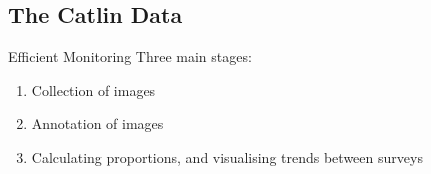 \documentclass{beamer}
\begin{document}
        \subsection{The Catlin Data}
            \begin{frame}{Efficient Monitoring}
                Three main stages:
                  \begin{enumerate}
                    \item Collection of images
                    \item Annotation of images
                    \item Calculating proportions, and visualising trends between surveys
                  \end{enumerate}
            \end{frame}
\end{document}
